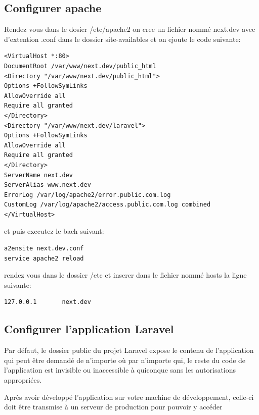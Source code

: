 \subsection{Configurer apache}
Rendez vous dans le dosier /etc/apache2
on cree un fichier nommé next.dev avec d'extention .conf dans le dossier site-availables
et on ejoute le code suivante: 

\begin{verbatim}
<VirtualHost *:80>
DocumentRoot /var/www/next.dev/public_html
<Directory "/var/www/next.dev/public_html">
Options +FollowSymLinks
AllowOverride all
Require all granted
</Directory>
<Directory "/var/www/next.dev/laravel">
Options +FollowSymLinks
AllowOverride all
Require all granted
</Directory>
ServerName next.dev
ServerAlias www.next.dev
ErrorLog /var/log/apache2/error.public.com.log
CustomLog /var/log/apache2/access.public.com.log combined
</VirtualHost>

\end{verbatim}

et puis executez le bach suivant:
\begin{verbatim}
a2ensite next.dev.conf
service apache2 reload
\end{verbatim}


rendez vous dans le dossier /etc et inserer dans le fichier nommé hosts la ligne suivante:
\begin{verbatim}
127.0.0.1       next.dev
\end{verbatim}

\subsection{Configurer l'application Laravel}
Par défaut, le dossier public du projet Laravel expose le contenu de l'application qui peut être
demandé de n'importe où par n'importe qui, le reste du code de l'application est invisible ou
inaccessible à quiconque sans les autorisations appropriées.

\medskip

Après avoir développé l'application sur votre machine de développement, celle-ci doit être
transmise à un serveur de production pour pouvoir y accéder

